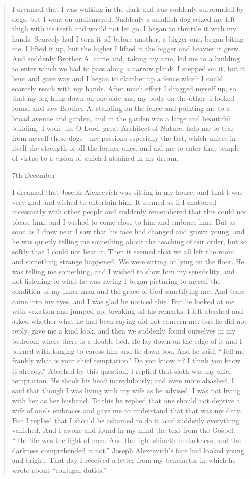 \begin{quote}
I dreamed that I was walking in the dark and was suddenly
surrounded by dogs, but I went on undismayed. Suddenly a smallish
dog seized my left thigh with its teeth and would not let go. I
began to throttle it with my hands. Scarcely had I torn it off
before another, a bigger one, began biting me. I lifted it up,
but the higher I lifted it the bigger and heavier it grew. And
suddenly Brother A. came and, taking my arm, led me to a building
to enter which we had to pass along a narrow plank. I stepped on
it, but it bent and gave way and I began to clamber up a fence
which I could scarcely reach with my hands. After much effort I
dragged myself up, so that my leg hung down on one side and my
body on the other. I looked round and saw Brother A. standing on
the fence and pointing me to a broad avenue and garden, and in
the garden was a large and beautiful building. I woke up. O Lord,
great Architect of Nature, help me to tear from myself these
dogs---my passions especially the last, which unites in itself
the strength of all the former ones, and aid me to enter that
temple of virtue to a vision of which I attained in my dream.

7th December

I dreamed that Joseph Alexeevich was sitting in my house, and
that I was very glad and wished to entertain him. It seemed as if
I chattered incessantly with other people and suddenly remembered
that this could not please him, and I wished to come close to him
and embrace him. But as soon as I drew near I saw that his face
had changed and grown young, and he was quietly telling me
something about the teaching of our order, but so softly that I
could not hear it. Then it seemed that we all left the room and
something strange happened. We were sitting or lying on the
floor. He was telling me something, and I wished to show him my
sensibility, and not listening to what he was saying I began
picturing to myself the condition of my inner man and the grace
of God sanctifying me. And tears came into my eyes, and I was
glad he noticed this. But he looked at me with vexation and
jumped up, breaking off his remarks. I felt abashed and asked
whether what he had been saying did not concern me; but he did
not reply, gave me a kind look, and then we suddenly found
ourselves in my bedroom where there is a double bed. He lay down
on the edge of it and I burned with longing to caress him and lie
down too. And he said, ``Tell me frankly what is your chief
temptation? Do you know it? I think you know it already.''
Abashed by this question, I replied that sloth was my chief
temptation. He shook his head incredulously; and even more
abashed, I said that though I was living with my wife as he
advised, I was not living with her as her husband. To this he
replied that one should not deprive a wife of one's embraces and
gave me to understand that that was my duty. But I replied that I
should be ashamed to do it, and suddenly everything vanished. And
I awoke and found in my mind the text from the Gospel: ``The life
was the light of men. And the light shineth in darkness; and the
darkness comprehended it not.'' Joseph Alexeevich's face had
looked young and bright. That day I received a letter from my
benefactor in which he wrote about ``conjugal duties.''


\end{quote}
